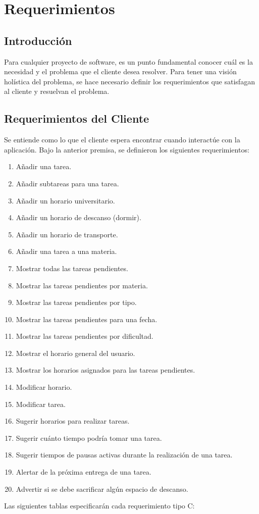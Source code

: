 
\chapter{Requerimientos}
\section{Introducción}
Para cualquier proyecto de software, es un punto fundamental conocer cuál es la necesidad y el problema que el cliente desea resolver. Para tener una visión holística del problema, se hace necesario definir los requerimientos que satisfagan al cliente y resuelvan el problema.
\newpage

\section{Requerimientos del Cliente}
Se entiende como lo que el cliente espera encontrar cuando interactúe con la aplicación. Bajo la anterior premisa, se definieron los siguientes requerimientos:
\begin{enumerate}
	\item Añadir una tarea.
	\item Añadir subtareas para una tarea.
	\item Añadir un horario universitario.
	\item Añadir un horario de descanso (dormir).
	\item Añadir un horario de transporte.
	\item Añadir una tarea a una materia.
	\item Mostrar todas las tareas pendientes.
	\item Mostrar las tareas pendientes por materia.
	\item Mostrar las tareas pendientes por tipo.
	\item Mostrar las tareas pendientes para una fecha.
	\item Mostrar las tareas pendientes por dificultad.
	\item Mostrar el horario general del usuario.
	\item Mostrar los horarios asignados para las tareas pendientes.
	\item Modificar horario.
	\item Modificar tarea.
	\item Sugerir horarios para realizar tareas.
	\item Sugerir cuánto tiempo podría tomar una tarea.
	\item Sugerir tiempos de pausas activas durante la realización de una tarea.
	\item Alertar de la próxima entrega de una tarea.
	\item Advertir si se debe sacrificar algún espacio de descanso.

\end{enumerate}

Las siguientes tablas especificarán cada requerimiento tipo C:
 

